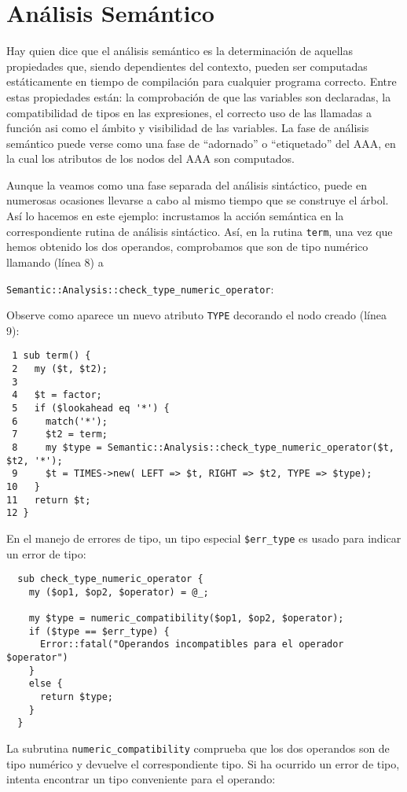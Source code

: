 \section{Análisis Semántico}
Hay quien dice que el análisis semántico es la determinación 
de aquellas propiedades que, siendo dependientes del contexto, pueden ser
computadas estáticamente en tiempo de compilación para cualquier programa
correcto. Entre estas propiedades
están: la comprobación de que las variables son declaradas,
la compatibilidad de tipos
en las expresiones, el correcto uso de las llamadas a función asi
como el ámbito y visibilidad de las variables.
La fase de análisis semántico puede verse como una fase de ``adornado''
o ``etiquetado'' del AAA, en la cual los atributos de los nodos
del AAA son computados.

Aunque la veamos como una fase separada del análisis sintáctico, puede
en numerosas ocasiones llevarse a cabo al mismo tiempo que se construye
el árbol. Así lo hacemos en este ejemplo: incrustamos la acción semántica
en la correspondiente rutina de análisis sintáctico. Así, en la rutina \verb|term|, una vez 
que hemos obtenido los dos operandos, comprobamos que son de tipo numérico
llamando (línea 8) a 

\begin{center}
\verb|Semantic::Analysis::check_type_numeric_operator|:
\end{center}

Observe como aparece un nuevo atributo \verb|TYPE| decorando el nodo
creado (línea 9):

\begin{verbatim}
 1 sub term() {
 2   my ($t, $t2);
 3 
 4   $t = factor;
 5   if ($lookahead eq '*') {
 6     match('*');
 7     $t2 = term;
 8     my $type = Semantic::Analysis::check_type_numeric_operator($t, $t2, '*');
 9     $t = TIMES->new( LEFT => $t, RIGHT => $t2, TYPE => $type);
10   }
11   return $t;
12 }
\end{verbatim}

En el manejo de errores de tipo, un tipo especial \verb|$err_type|
es usado para indicar un error de tipo:

\begin{verbatim}
  sub check_type_numeric_operator {
    my ($op1, $op2, $operator) = @_;

    my $type = numeric_compatibility($op1, $op2, $operator);
    if ($type == $err_type) {
      Error::fatal("Operandos incompatibles para el operador $operator") 
    }
    else {
      return $type;
    }
  }
\end{verbatim}
La subrutina \verb|numeric_compatibility| comprueba que los
dos operandos son de tipo numérico y devuelve el correspondiente
tipo. Si ha ocurrido un error de tipo, intenta encontrar 
un tipo conveniente para el operando:


